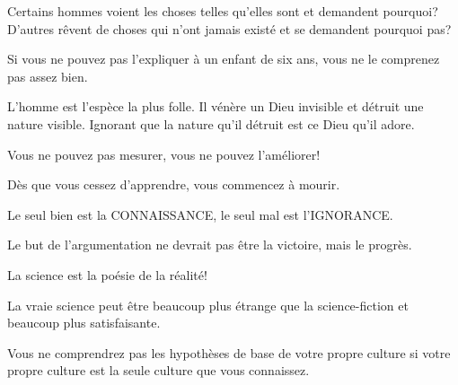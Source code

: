  	\begin{fquote}Certains hommes voient les choses telles qu'elles sont et demandent pourquoi? D'autres rêvent de choses qui n'ont jamais existé et se demandent pourquoi pas?
 	\end{fquote}
 	
 	\begin{fquote}Si vous ne pouvez pas l'expliquer à un enfant de six ans, vous ne le comprenez pas assez bien.
 	\end{fquote}
 	
 	\begin{fquote}L'homme est l'espèce la plus folle. Il vénère un Dieu invisible et détruit une nature visible. Ignorant que la nature qu'il détruit est ce Dieu qu'il adore.
 	\end{fquote}
 	
 	\begin{fquote}Vous ne pouvez pas mesurer, vous ne pouvez l'améliorer!
 	\end{fquote}
 	
 	\begin{fquote}Dès que vous cessez d'apprendre, vous commencez à mourir.
 	\end{fquote}
 	
 	\begin{fquote}[Socrates]Le seul bien est la CONNAISSANCE, le seul mal est l'IGNORANCE.
 	\end{fquote}
 	
 	\begin{fquote}[?]Le but de l'argumentation ne devrait pas être la victoire, mais le progrès.
 	\end{fquote}
 	
 	\begin{fquote}La science est la poésie de la réalité!
 	\end{fquote}
 	
 	\begin{fquote}La vraie science peut être beaucoup plus étrange que la science-fiction et beaucoup plus satisfaisante.
 	\end{fquote}
 	
 	\begin{fquote}Vous ne comprendrez pas les hypothèses de base de votre propre culture si votre propre culture est la seule culture que vous connaissez.
 	\end{fquote}
 	
